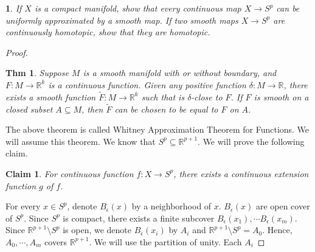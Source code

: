 \documentclass[11pt, twoside, a4paper]{article}
\newtheorem{claim}{Claim}{}
\theoremstyle{prob}
\newtheorem{problem}{}
\newtheorem{thm}{Thm}{}
\newcommand{\mb}{\mathbb}
\begin{document}
\begin{problem}
    If $X$ is a compact manifold, show that every continuous map $X\to S^p$ can be uniformly approximated by a smooth map. If two smooth maps $X\to S^p$ are continuously homotopic, show that they are homotopic.
\end{problem}

\begin{proof}
    \begin{thm}
        Suppose $M$ is a smooth manifold with or without boundary, and $F: M\to \mb{R}^k$ is a continuous function. Given any positive function $\delta:M\to \mb{R}$, there exists a smooth function $\tilde{F}:M\to \mb{R}^k $ such that is $\delta$-close to $F$. If $F$ is smooth on a closed subset $A\subseteq M$, then $\tilde{F}$ can be chosen to be equal to $F$ on $A$.
    \end{thm}
    The above theorem is called Whitney Approximation Theorem for Functions. We will assume this theorem. 
    We know that $S^p \subseteq \mb{R}^{p+1}$. We will prove the following claim.
    \begin{claim}
        For continuous function $f: X\to S^p$, there exists a continuous extension function $g$ of $f$.
    \end{claim}
    For every $x\in S^p$, denote $B_\epsilon(x)$ by a neighborhood of $x$. $B_\epsilon(x)$ are open cover of $S^p$. Since $S^p$ is compact, there exists a finite subcover $B_\epsilon(x_1), \cdots B_\epsilon(x_m)$. Since $\mb{R}^{p+1}\setminus S^p$ is open, we denote $B_\epsilon(x_i)$ by $A_i$ and $\mb{R}^{p+1}\setminus S^p=A_0$. Hence, $A_0,\cdots,A_m$ covers $\mb{R}^{p+1}$. We will use the partition of unity. Each $A_i$ 


\end{proof}
\end{document}
